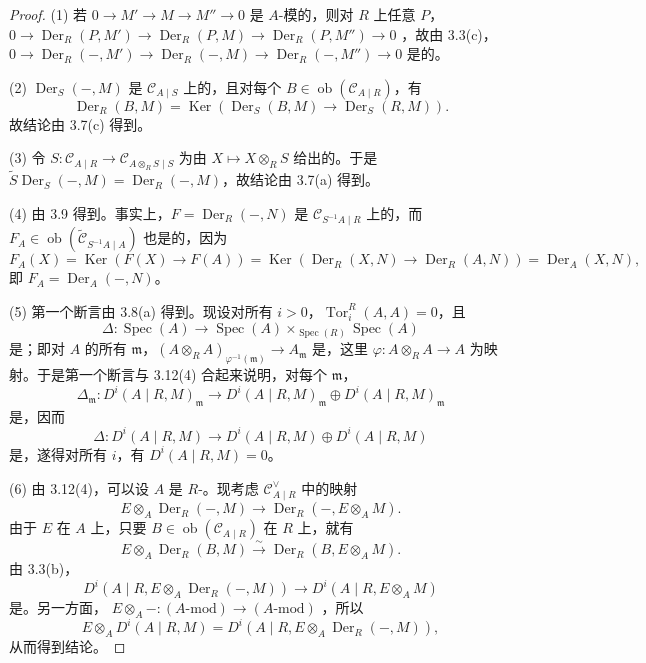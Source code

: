 \begin{proof}
(1) 若 $0\to M'\to M\to M''\to0$ 是 $A$-模的，则对 $R$ 上任意 $P$，$0\to\operatorname{Der}_R(P,M')\to\operatorname{Der}_R(P,M)\to\operatorname{Der}_R(P,M'')\to0$ ，故由 3.3(c)，$0\to\operatorname{Der}_R(-,M')\to\operatorname{Der}_R(-,M)\to\operatorname{Der}_R(-,M'')\to0$ 是的。

(2) $\operatorname{Der}_S(-,M)$ 是 $\mathcal C_{A\mid S}$ 上的，且对每个 $B\in\operatorname{ob}(\mathcal C_{A\mid R})$，有
\[\operatorname{Der}_R(B,M)=\operatorname{Ker}(\operatorname{Der}_S(B,M)\to\operatorname{Der}_S(R,M)).\]
故结论由 3.7(c) 得到。

(3) 令 $S:\mathcal C_{A\mid R}\to\mathcal C_{A\otimes_R S\mid S}$ 为由 $X\mapsto X\otimes_R S$ 给出的。于是 $\widetilde S\operatorname{Der}_S(-,M)=\operatorname{Der}_R(-,M)$，故结论由 3.7(a) 得到。

(4) 由 3.9 得到。事实上，$F=\operatorname{Der}_R(-,N)$ 是 $\mathcal C_{S^{-1}A\mid R}$ 上的，而 $F_A\in\operatorname{ob}(\widetilde{\mathcal C}_{S^{-1}A\mid A})$ 也是的，因为
\[F_A(X)=\operatorname{Ker}(F(X)\to F(A))=\operatorname{Ker}(\operatorname{Der}_R(X,N)\to\operatorname{Der}_R(A,N))=\operatorname{Der}_A(X,N),\]
即 $F_A=\operatorname{Der}_A(-,N)$。

(5) 第一个断言由 3.8(a) 得到。现设对所有 $i>0$，$\operatorname{Tor}_i^R(A,A)=0$，且
\[\Delta:\operatorname{Spec}(A)\longrightarrow\operatorname{Spec}(A)\mathbin{\times_{\operatorname{Spec}(R)}}\operatorname{Spec}(A)\]
是；即对 $A$ 的所有 $\mathfrak m$，$(A\otimes_R A)_{\varphi^{-1}(\mathfrak m)}\to A_{\mathfrak m}$ 是，这里 $\varphi:A\otimes_R A\to A$ 为映射。于是第一个断言与 3.12(4) 合起来说明，对每个 $\mathfrak m$，
\[\Delta_{\mathfrak m}:D^i(A\mid R,M)_{\mathfrak m}\longrightarrow D^i(A\mid R,M)_{\mathfrak m}\oplus D^i(A\mid R,M)_{\mathfrak m}\]
是，因而
\[\Delta:D^i(A\mid R,M)\longrightarrow D^i(A\mid R,M)\oplus D^i(A\mid R,M)\]
是，遂得对所有 $i$，有 $D^i(A\mid R,M)=0$。

(6) 由 3.12(4)，可以设 $A$ 是 $R$-。现考虑 $\mathcal C_{A\mid R}^{\vee}$ 中的映射
\[E\otimes_A\operatorname{Der}_R(-,M)\longrightarrow\operatorname{Der}_R(-,E\otimes_A M).\]
由于 $E$ 在 $A$ 上，只要 $B\in\operatorname{ob}(\mathcal C_{A\mid R})$ 在 $R$ 上，就有
\[E\otimes_A\operatorname{Der}_R(B,M)\xrightarrow{\sim}\operatorname{Der}_R(B,E\otimes_A M).\]
由 3.3(b)，
\[D^i(A\mid R,E\otimes_A\operatorname{Der}_R(-,M))\longrightarrow D^i(A\mid R,E\otimes_A M)\]
是。另一方面， $E\otimes_A-:(A\text{-mod})\to(A\text{-mod})$ ，所以
\[E\otimes_A D^i(A\mid R,M)=D^i(A\mid R,E\otimes_A\operatorname{Der}_R(-,M)),\]
从而得到结论。


\end{proof}
